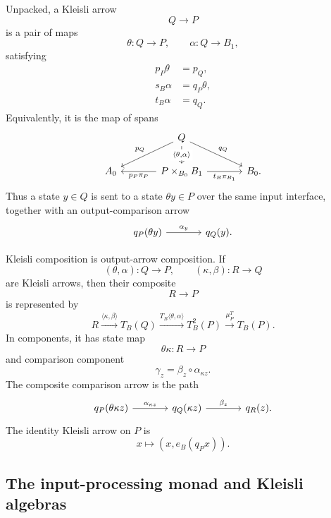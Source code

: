 Unpacked, a Kleisli arrow
\[
    Q\to P
\]
is a pair of maps
\[
    \theta:Q\to P,
    \qquad
    \alpha:Q\to B_1,
\]
satisfying
\begin{align}
    p_P\theta&=p_Q,
    \label{eq:kleisli-arrow-input}
    \\
    s_B\alpha&=q_P\theta,
    \label{eq:kleisli-arrow-source}
    \\
    t_B\alpha&=q_Q.
    \label{eq:kleisli-arrow-target}
\end{align}
Equivalently, it is the map of spans
\[
    \begin{tikzcd}[column sep=large]
        & 
            Q
                \arrow[d, "{\langle \theta,\alpha\rangle}" description]
                \arrow[dl, "p_Q"']
                \arrow[dr, "q_Q"]
        &
        \\
            A_0
        &
            P\times_{B_0}B_1
                \arrow[l, "p_P\pi_P"]
                \arrow[r, "t_B\pi_{B_1}"']
        &
            B_0.
    \end{tikzcd}
\]
Thus a state \(y\in Q\) is sent to a state \(\theta y\in P\) over the same input interface, together with an output-comparison arrow
\[
    \begin{tikzcd}[column sep=large]
            q_P(\theta y) 
                \arrow[r, "\alpha_y"] 
        & 
            q_Q(y).
    \end{tikzcd}
\]

Kleisli composition is output-arrow composition. If
\[
    (\theta,\alpha):Q\to P,
    \qquad
    (\kappa,\beta):R\to Q
\]
are Kleisli arrows, then their composite
\[
    R\to P
\]
is represented by
\[
    R
        \xrightarrow{\langle\kappa,\beta\rangle}
    T_B(Q)
        \xrightarrow{T_B\langle\theta,\alpha\rangle}
    T_B^2(P)
        \xrightarrow{\mu^T_P}
    T_B(P).
\]
In components, it has state map
\[
    \theta\kappa:R\to P
\]
and comparison component
\[
    \gamma_z=\beta_z\circ\alpha_{\kappa z}.
\]
The composite comparison arrow is the path
\[
    \begin{tikzcd}[column sep=large]
            q_P(\theta\kappa z)
                \arrow[r, "\alpha_{\kappa z}"]
        &
            q_Q(\kappa z)
                \arrow[r, "\beta_z"]
        &
            q_R(z).
    \end{tikzcd}
\]
The identity Kleisli arrow on \(P\) is
\[
    x\longmapsto (x,e_B(q_Px)).
\]

\subsection{The input-processing monad and Kleisli algebras}
\label{subsec:input-monad-kleisli-algebras}

